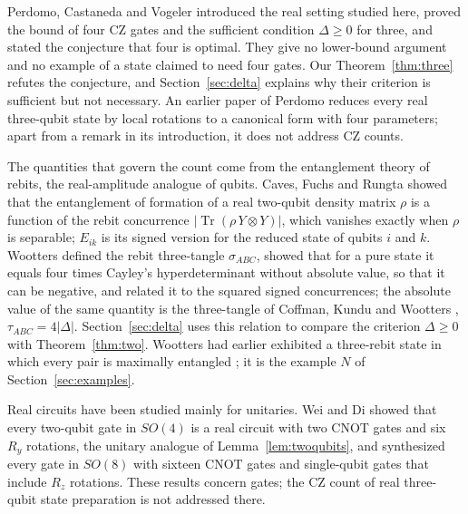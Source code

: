\documentclass[11pt,a4paper]{article}
\theoremstyle{definition}
\theoremstyle{plain}
\DeclareMathOperator{\Tr}{Tr}
\begin{document}
Perdomo, Castaneda and Vogeler \cite{Perdomo2022} introduced the real setting
studied here, proved the bound of four CZ gates and the sufficient condition
$\Delta\ge0$ for three, and stated the conjecture that four is optimal. They
give no lower-bound argument and no example of a state claimed to need four
gates. Our Theorem~\ref{thm:three} refutes the conjecture, and
Section~\ref{sec:delta} explains why their criterion is sufficient but not
necessary. An earlier paper of Perdomo \cite{Perdomo2020} reduces every real
three-qubit state by local rotations to a canonical form with four parameters;
apart from a remark in its introduction, it does not address CZ counts.

The quantities that govern the count come from the entanglement theory of
rebits, the real-amplitude analogue of qubits. Caves, Fuchs and Rungta
\cite{CavesFuchsRungta2001} showed that the entanglement of formation of a real
two-qubit density matrix $\rho$ is a function of the rebit concurrence
$\lvert\Tr(\rho\,Y\otimes Y)\rvert$, which vanishes exactly when $\rho$ is
separable; $E_{ik}$ is its signed version for the reduced state of qubits $i$
and $k$. Wootters \cite{Wootters2014} defined the rebit three-tangle
$\sigma_{ABC}$, showed that for a pure state it equals four times Cayley's
hyperdeterminant without absolute value, so that it can be negative, and
related it to the squared signed concurrences; the absolute value of the same
quantity is the three-tangle of Coffman, Kundu and Wootters
\cite{CoffmanKunduWootters2000}, $\tau_{ABC}=4\lvert\Delta\rvert$.
Section~\ref{sec:delta} uses this relation to compare the criterion
$\Delta\ge0$ with Theorem~\ref{thm:two}. Wootters had earlier exhibited a
three-rebit state in which every pair is maximally entangled
\cite{Wootters2012}; it is the example $N$ of Section~\ref{sec:examples}.

Real circuits have been studied mainly for unitaries. Wei and Di
\cite{WeiDi2012} showed that every two-qubit gate in $SO(4)$ is a real circuit
with two CNOT gates and six $R_y$ rotations, the unitary analogue of
Lemma~\ref{lem:twoqubits}, and synthesized every gate in $SO(8)$ with sixteen
CNOT gates and single-qubit gates that include $R_z$ rotations. These results
concern gates; the CZ count of real three-qubit state preparation is not
addressed there.
\end{document}
